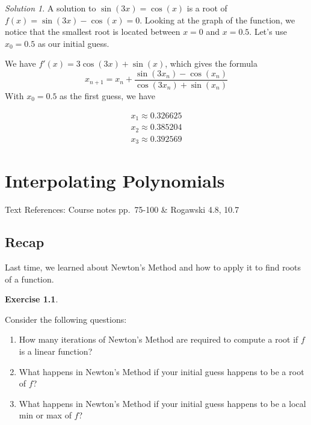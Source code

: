\documentclass[
]{book}
\providecommand{\tightlist}{%
  \setlength{\itemsep}{0pt}\setlength{\parskip}{0pt}}
\theoremstyle{definition}
\theoremstyle{definition}
\theoremstyle{definition}
\newtheorem{exercise}{Exercise}[chapter]
\theoremstyle{definition}
\theoremstyle{remark}
\newtheorem*{solution}{Solution}
\begin{document}
\begin{solution}

A solution to \(\sin(3x)=\cos(x)\) is a root of \(f(x)=\sin(3x)-\cos(x)=0\). Looking at the graph of the function, we notice that the smallest root is located between \(x=0\) and \(x=0.5\). Let's use \(x_0=0.5\) as our initial guess.

We have \(f'(x)=3 \cos(3x)+\sin(x)\), which gives the formula \[x_{n+1}=x_n+\frac{\sin(3x_n)-\cos(x_n)}{ \cos(3x_n)+\sin(x_n)}\]
With \(x_0=0.5\) as the first guess, we have

\begin{align*}
x_1 \approx 0.326625\\
x_2 \approx 0.385204\\
x_3 \approx 0.392569
\end{align*}

\end{solution}

\hypertarget{lec-19}{%
\chapter{Interpolating Polynomials}\label{lec-19}}

Text References: Course notes pp.~75-100 \& Rogawski 4.8, 10.7

\hypertarget{recap-17}{%
\section{Recap}\label{recap-17}}

Last time, we learned about Newton's Method and how to apply it to find roots of a function.

\begin{exercise}
\protect\hypertarget{exr:unlabeled-div-136}{}\label{exr:unlabeled-div-136}

Consider the following questions:

\begin{enumerate}
\def\labelenumi{\alph{enumi}.}
\tightlist
\item
  How many iterations of Newton's Method are required to compute a root if \(f\) is a linear function?
\item
  What happens in Newton's Method if your initial guess happens to be a root of \(f\)?
\item
  What happens in Newton's Method if your initial guess happens to be a local min or max of \(f\)?
\end{enumerate}

\end{exercise}
\end{document}
